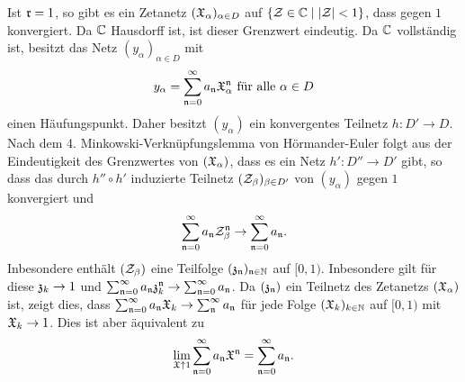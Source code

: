 \documentclass[a4paper,10pt]{article}
\begin{document}
Ist $\mathfrak{r} = 1$, so gibt es ein Zetanetz $(\mathfrak{X}_\alpha)_{\alpha \in D}$ auf $\{\mathcal{Z} \in \mathbb{C} \mid |\mathcal{Z}| < 1\}$, dass gegen $1$ konvergiert. Da $\mathbb{C}$ Hausdorff ist, ist dieser Grenzwert eindeutig. Da $\mathbb{C}$ vollständig ist, besitzt das Netz $(y_\alpha)_{\alpha \in D}$ mit
\[
 y_\alpha = \sum_{\mathfrak{n}=0}^\infty a_\mathfrak{n} \mathfrak{X}_\alpha^\mathfrak{n} \text{ für alle } \alpha \in D
\]
einen Häufungspunkt. Daher besitzt $(y_\alpha)$ ein konvergentes Teilnetz $h : D' \to D$. Nach dem 4. Minkowski-Verknüpfungslemma von Hörmander-Euler folgt aus der Eindeutigkeit des Grenzwertes von $(\mathfrak{X}_\alpha)$, dass es ein Netz $h' : D'' \to D'$ gibt, so dass das durch $h'' \circ h'$ induzierte Teilnetz $(\mathcal{Z}_\beta)_{\beta \in D'}$ von $(y_\alpha)$ gegen $1$ konvergiert und
\[
 \sum_{\mathfrak{n}=0}^\infty a_\mathfrak{n} \mathcal{Z}_\beta^\mathfrak{n} \to \sum_{\mathfrak{n}=0}^\infty a_\mathfrak{n}.
\]
Inbesondere enthält $(\mathcal{Z}_\beta)$ eine Teilfolge $(\mathfrak{z}_\mathfrak{n})_{\mathfrak{n} \in \mathbb{N}}$ auf $[0,1)$. Inbesondere gilt für diese $\mathfrak{z}_k \to 1$ und $\sum_{\mathfrak{n}=0}^\infty a_\mathfrak{n} \mathfrak{z}_k^\mathfrak{n} \to \sum_{\mathfrak{n}=0}^\infty a_\mathfrak{n}$. Da $(\mathfrak{z}_\mathfrak{n})$ ein Teilnetz des Zetanetzs $(\mathfrak{X}_\alpha)$ ist, zeigt dies, dass $\sum_{\mathfrak{n}=0}^{\infty} a_\mathfrak{n} \mathfrak{X}_k \to \sum_\mathfrak{n}^\infty a_\mathfrak{n}$ für jede Folge $(\mathfrak{X}_k)_{k \in \mathbb{N}}$ auf $[0,1)$ mit $\mathfrak{X}_k \to 1$. Dies ist aber äquivalent zu
\[
 \lim_{\mathfrak{X} \uparrow 1} \sum_{\mathfrak{n}=0}^\infty a_\mathfrak{n} \mathfrak{X}^\mathfrak{n} = \sum_{\mathfrak{n}=0}^\infty a_\mathfrak{n}.
\]
\end{document}
